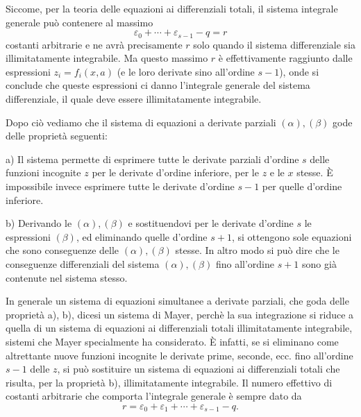 \documentclass[11pt]{book}
\begin{document}
Siccome, per la teoria delle equazioni ai differenziali totali, il sistema integrale generale può contenere al massimo
\[
 \varepsilon_0+\cdots+\varepsilon_{s-1}-q=r
\]
costanti arbitrarie e ne avrà precisamente $r$ solo quando il sistema differenziale sia illimitatamente integrabile. Ma questo massimo $r$ è effettivamente raggiunto dalle espressioni $z_i=f_i(x,a)$ (e le loro derivate sino all'ordine $s-1$), onde si conclude che queste espressioni ci danno l'integrale generale del sistema differenziale, il quale deve essere illimitatamente integrabile.

Dopo ciò vediamo che il sistema di equazioni a derivate parziali $(\alpha),(\beta)$ gode delle proprietà seguenti:

a) Il sistema permette di esprimere tutte le derivate parziali d'ordine $s$ delle funzioni incognite $z$ per le derivate d'ordine inferiore, per le $z$ e le $x$ stesse. È impossibile invece esprimere tutte le derivate d'ordine $s-1$ per quelle d'ordine inferiore\begingroup\renewcommand\thefootnote{(*)}\footnotemark\endgroup.
\begingroup\renewcommand\thefootnote{(*)}\endgroup{}

b) Derivando le $(\alpha),(\beta)$ e sostituendovi per le derivate d'ordine $s$ le espressioni $(\beta)$, ed eliminando quelle d'ordine $s+1$, si ottengono sole equazioni che sono conseguenze delle $(\alpha),(\beta)$ stesse\begingroup\renewcommand\thefootnote{(**)}\footnotemark\endgroup. In altro modo si può dire che le conseguenze differenziali del sistema $(\alpha),(\beta)$ fino all'ordine $s+1$ sono già contenute nel sistema stesso.
\begingroup\renewcommand\thefootnote{(**)}\endgroup{}

In generale un sistema di equazioni simultanee a derivate parziali, che goda delle proprietà a), b), dicesi un sistema di Mayer, perchè la sua integrazione si riduce a quella di un sistema di equazioni ai differenziali totali illimitatamente integrabile, sistemi che Mayer specialmente ha considerato. È infatti, se si eliminano come altrettante nuove funzioni incognite le derivate prime, seconde, ecc. fino all'ordine $s-1$ delle $z$, si può sostituire un sistema di equazioni ai differenziali totali che risulta, per la proprietà b), illimitatamente integrabile. Il numero effettivo di costanti arbitrarie che comporta l'integrale generale è sempre dato da
\[
 r=\varepsilon_0+\varepsilon_1+\cdots+\varepsilon_{s-1}-q.
\]
\end{document}
